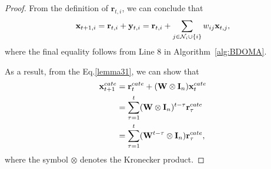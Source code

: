 	\begin{proof}
		From the definition of $\mathbf{r}_{t,i}$, we can conclude that 
		\begin{equation}\label{lemma31}
			\mathbf{x}_{t+1,i}=\mathbf{r}_{t,i}+\mathbf{y}_{t,i}=\mathbf{r}_{t,i}+\sum_{j\in\mathcal{N}_{i}\cup\{i\}}w_{ij}\mathbf{x}_{t,j},
		\end{equation} where the final equality follows from Line 8 in Algorithm~\ref{alg:BDOMA}. 
		
		As a result, from the Eq.\eqref{lemma31}, we can show that
		\begin{equation}\label{lemma32}
			\begin{aligned}
				\mathbf{x}_{t+1}^{cate}& =\mathbf{r}_{t}^{cate}+(\mathbf{W}\otimes\mathbf{I}_{n})\mathbf{x}_{t}^{cate}\\
				&=\sum_{\tau=1}^{t}(\mathbf{W}\otimes\mathbf{I}_{n})^{t-\tau}\mathbf{r}_{\tau}^{cate}\\
				&=\sum_{\tau=1}^{t}(\mathbf{W}^{t-\tau}\otimes\mathbf{I}_{n})\mathbf{r}_{\tau}^{cate},
			\end{aligned}
		\end{equation} where the symbol $\otimes$ denotes the Kronecker product.
		

\end{proof}
